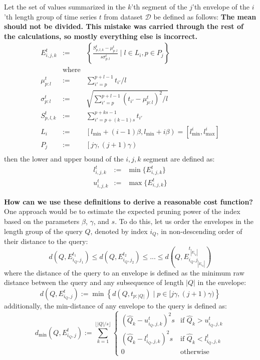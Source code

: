 \documentclass[12pt,a4paper]{article}
\newcommand{\segsum}[3]{S_{#1,#2,#3}^t} %
\newcommand{\subsmean}[2]{\mu^t_{#1:#2}} %
\newcommand{\subsvar}[2]{\sigma^t_{#1:#2}} %
\newcommand{\envelope}[4]{E_{#1,#2,#3}^{#4}} %
\newcommand{\envelopeijkt}{\envelope{i}{j}{k}{t}} %
\newcommand{\lengthrange}[1]{L_{#1}} %
\newcommand{\posrange}[1]{P_{#1}} %
\newcommand{\segsumplk}{\segsum{p}{l}{k}} %
\newcommand{\subsmeanpl}{\subsmean{p}{l}} %
\newcommand{\subsvarpl}{\subsvar{p}{l}} %
\begin{document}
Let the set of values summarized in the $k$'th segment of the $j$'th envelope of the $i$'th length group of time series $t$ from dataset $\mathcal{D}$ be defined as follows: \textbf{The mean should not be divided. This mistake was carried through the rest of the calculations, so mostly everything else is incorrect.}
$$
\begin{array}{rcl}
    \envelopeijkt & := & \left\{ \frac{\segsumplk-\subsmeanpl}{s\subsvarpl}  \mid l\in \lengthrange{i},p\in \posrange{j} \right\} \\[4pt]
    & \text{where} & \\[4pt]
    \subsmeanpl & := & \sum_{i'=p}^{p+l-1} t_{i'} / l \\[4pt]
    \subsvarpl & := & \sqrt{\sum_{i'=p}^{p+l-1}\left(t_{i'}-\subsmeanpl\right)^2/l} \\[4pt]
    \segsumplk & := & \sum_{i'=p+(k-1)s}^{p+ks-1}t_{i'}\\[4pt]
    \lengthrange{i} & := & \left[l_{\min}+(i-1)\beta,l_{\min}+i\beta\right) = [l_{\min}^i,l_{\max}^i] \\[4pt]
    \posrange{j} & := & \left[j\gamma, (j+1)\gamma\right) \\
\end{array}
$$
then the lower and upper bound of the $i,j,k$ segment are defined as:
$$\begin{array}{rcl}
    l_{i,j,k}^t & := & \min\{\envelopeijkt\} \\[4pt]
    u_{i,j,k}^t & := & \max\{\envelopeijkt\}
\end{array}$$

\textbf{How can we use these definitions to derive a reasonable cost function?} One approach would be to estimate the expected pruning power of the index based on the parameters $\beta$, $\gamma$, and $s$. To do this, let us order the envelopes in the length group of the query $Q$, denoted by index $i_Q$, in non-descending order of their distance to the query:
$$d\left(Q,E_{i_Q,j_1}^{t_1}\right)\le d\left(Q,E_{i_Q,j_2}^{t_2}\right)\le ...\le d\left(Q,E_{i_Q,j_{|E_{i_Q}|}}^{t_{|E_{i_Q}|}}\right)$$
where the distance of the query to an envelope is defined as the minimum raw distance between the query and any subsequence of length $|Q|$ in the envelope:
$$d\left(Q,E_{i_Q,j}^t\right):=\min\left\{d\left(Q,t_{p:|Q|}\right) \mid p \in [j\gamma,(j+1)\gamma) \right\}$$
additionally, the min-distance of any envelope to the query is defined as:
$$d_{\min}\left(Q,E_{i_Q,j}^t\right):=\sum_{k=1}^{\lfloor |Q| / s \rfloor}\begin{cases}
    \left(\hat Q_k - u_{i_Q,j,k}^t\right)^2s & \text{if } \hat Q_k > u_{i_Q,j,k}^t \\[4pt]
    \left(\hat Q_k - l_{i_Q,j,k}^t\right)^2s & \text{if } \hat Q_k < l_{i_Q,j,k}^t \\[4pt]
    0 & \text{otherwise}
\end{cases}$$
\end{document}
